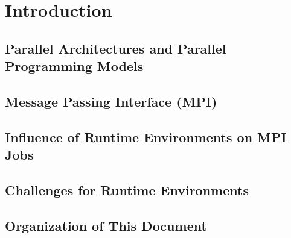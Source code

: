 \chapter{Introduction}
\label{sec:Introduction}

\section{Parallel Architectures and Parallel Programming Models}
\label{sec:Introduction}


\section{Message Passing Interface (MPI)}
\label{sec:Introduction}


\section{Influence of Runtime Environments on MPI Jobs}
\label{sec:Introduction}


\section{Challenges for Runtime Environments}
\label{sec:Introduction}


\section{Organization of This Document}
\label{sec:Introduction}

